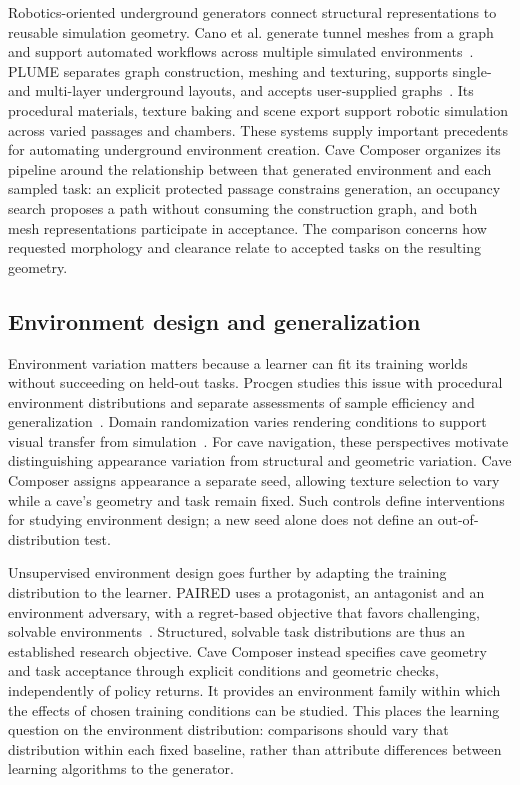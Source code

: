 Robotics-oriented underground generators connect structural representations
to reusable simulation geometry. Cano et al. generate tunnel meshes from a
graph and support automated workflows across multiple simulated
environments~\cite{cano2024tunnels}. PLUME separates graph construction,
meshing and texturing, supports single- and multi-layer underground layouts,
and accepts user-supplied graphs~\cite{garcia2025plume}. Its procedural
materials, texture baking and scene export support robotic simulation across
varied passages and chambers. These systems supply important precedents for
automating underground environment creation. Cave Composer organizes its
pipeline around the relationship between that generated environment and each
sampled task: an explicit protected passage constrains generation, an occupancy
search proposes a path without consuming the construction graph, and both
mesh representations participate in acceptance. The comparison concerns how
requested morphology and clearance relate to accepted tasks on the resulting
geometry.

\subsection{Environment design and generalization}
Environment variation matters because a learner can fit its training worlds
without succeeding on held-out tasks. Procgen studies this issue with procedural
environment distributions and separate assessments of sample efficiency and
generalization~\cite{cobbe2020procgen}. Domain randomization varies rendering
conditions to support visual transfer from simulation~\cite{tobin2017randomization}.
For cave navigation, these perspectives motivate distinguishing appearance
variation from structural and geometric variation. Cave Composer assigns
appearance a separate seed, allowing texture selection to vary while a cave's
geometry and task remain fixed. Such controls define interventions for studying
environment design; a new seed alone does not define an out-of-distribution test.

Unsupervised environment design goes further by adapting the training
distribution to the learner. PAIRED uses a protagonist, an antagonist and an
environment adversary, with a regret-based objective that favors challenging,
solvable environments~\cite{dennis2020paired}. Structured, solvable task
distributions are thus an established research objective. Cave Composer instead
specifies cave geometry and task acceptance through explicit conditions and
geometric checks, independently of policy returns. It provides an environment
family within which the effects of chosen training conditions can be studied.
This places the learning question on the environment distribution: comparisons
should vary that distribution within each fixed baseline, rather than attribute
differences between learning algorithms to the generator.

